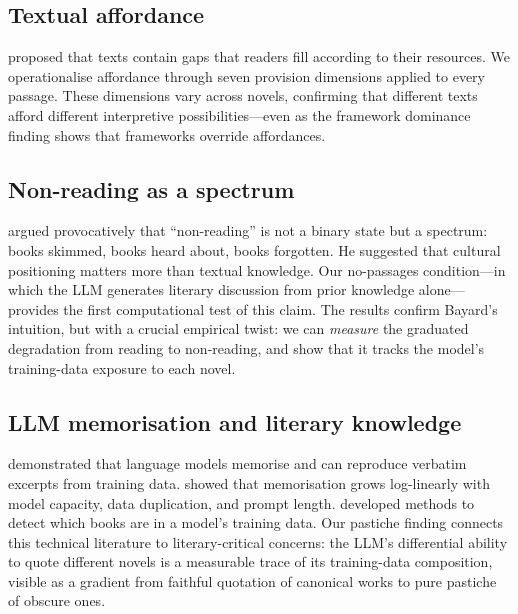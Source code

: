 \documentclass{article}
\begin{document}
\subsection{Textual affordance}

\textcite{iser1978act} proposed that texts contain gaps that readers
fill according to their resources.  We operationalise affordance
through seven provision dimensions applied to every passage.  These
dimensions vary across novels, confirming that different texts afford
different interpretive possibilities---even as the framework dominance finding
shows that frameworks override affordances.

\subsection{Non-reading as a spectrum}

\textcite{bayard2007comment} argued provocatively that ``non-reading''
is not a binary state but a spectrum: books skimmed, books heard about,
books forgotten.  He suggested that cultural positioning matters more
than textual knowledge.  Our no-passages condition---in which the LLM
generates literary discussion from prior knowledge alone---provides the
first computational test of this claim.  The results confirm Bayard's
intuition, but with a crucial empirical twist: we can \emph{measure}
the graduated degradation from reading to non-reading, and show that it
tracks the model's training-data exposure to each novel.

\subsection{LLM memorisation and literary knowledge}

\textcite{carlini2021extracting} demonstrated that language models
memorise and can reproduce verbatim excerpts from training data.
\textcite{carlini2023quantifying} showed that memorisation grows
log-linearly with model capacity, data duplication, and prompt length.
\textcite{duarte2024decop} developed methods to detect which books are
in a model's training data.  Our pastiche finding connects this
technical literature to literary-critical concerns: the LLM's
differential ability to quote different novels is a measurable trace of
its training-data composition, visible as a gradient from faithful
quotation of canonical works to pure pastiche of obscure ones.


\end{document}
